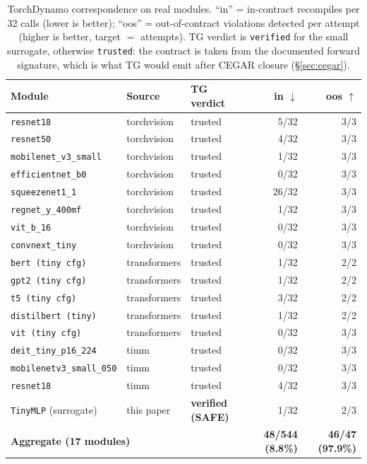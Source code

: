 \begin{table}[t]
\centering
\small
\caption{TorchDynamo correspondence on real modules. ``in'' = in-contract
recompiles per 32 calls (lower is better); ``oos'' = out-of-contract
violations detected per attempt (higher is better, target $=$ attempts).
TG verdict is \texttt{verified} for the small surrogate, otherwise
\texttt{trusted}: the contract is taken from the documented forward
signature, which is what TG would emit after CEGAR closure
(\S\ref{sec:cegar}).}
\label{tab:dynamo}
\begin{tabular}{lllrr}
\toprule
Module & Source & TG verdict & in $\downarrow$ & oos $\uparrow$ \\
\midrule
\texttt{resnet18}             & torchvision & trusted  & 5/32 & 3/3 \\
\texttt{resnet50}             & torchvision & trusted  & 4/32 & 3/3 \\
\texttt{mobilenet\_v3\_small} & torchvision & trusted  & 1/32 & 3/3 \\
\texttt{efficientnet\_b0}     & torchvision & trusted  & 0/32 & 3/3 \\
\texttt{squeezenet1\_1}       & torchvision & trusted  & 26/32 & 3/3 \\
\texttt{regnet\_y\_400mf}     & torchvision & trusted  & 1/32 & 3/3 \\
\texttt{vit\_b\_16}           & torchvision & trusted  & 0/32 & 3/3 \\
\texttt{convnext\_tiny}       & torchvision & trusted  & 0/32 & 3/3 \\
\texttt{bert (tiny cfg)}      & transformers & trusted & 1/32 & 2/2 \\
\texttt{gpt2 (tiny cfg)}      & transformers & trusted & 1/32 & 2/2 \\
\texttt{t5 (tiny cfg)}        & transformers & trusted & 3/32 & 2/2 \\
\texttt{distilbert (tiny)}    & transformers & trusted & 1/32 & 2/2 \\
\texttt{vit (tiny cfg)}       & transformers & trusted & 0/32 & 3/3 \\
\texttt{deit\_tiny\_p16\_224} & timm        & trusted  & 0/32 & 3/3 \\
\texttt{mobilenetv3\_small\_050} & timm     & trusted  & 0/32 & 3/3 \\
\texttt{resnet18}             & timm        & trusted  & 4/32 & 3/3 \\
\texttt{TinyMLP} (surrogate)  & this paper  & \textbf{verified (SAFE)} & 1/32 & 2/3 \\
\midrule
\multicolumn{3}{l}{\textbf{Aggregate (17 modules)}} & \textbf{48/544 (8.8\%)} & \textbf{46/47 (97.9\%)} \\
\bottomrule
\end{tabular}
\end{table}

